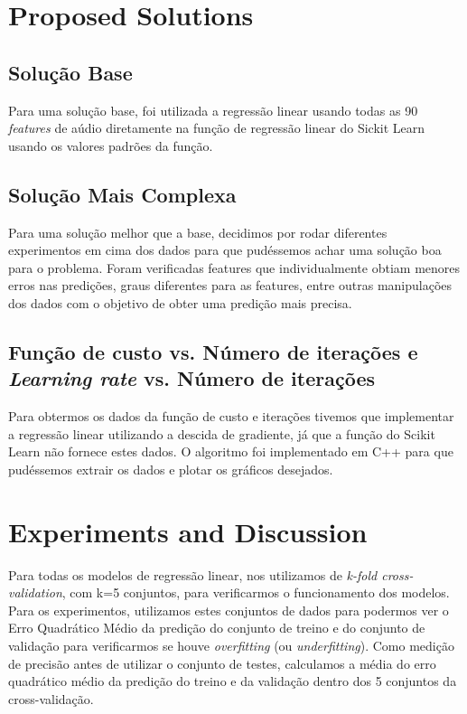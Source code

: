 \documentclass[conference]{IEEEtran}
\begin{document}
\section{Proposed Solutions}
\subsection{Solução Base}
Para uma solução base, foi utilizada a regressão linear usando todas as 90 \textit{features} de aúdio diretamente na função de regressão linear do Sickit Learn usando os valores padrões da função.

\subsection{Solução Mais Complexa}
Para uma solução melhor que a base, decidimos por rodar diferentes experimentos em cima dos dados para que pudéssemos achar uma solução boa para o problema. Foram verificadas features que individualmente obtiam menores erros nas predições, graus diferentes para as features, entre outras manipulações dos dados com o objetivo de obter uma predição mais precisa.

\subsection{Função de custo vs. Número de iterações e \textit{Learning rate} vs. Número de iterações}
Para obtermos os dados da função de custo e iterações tivemos que implementar a regressão linear utilizando a descida de gradiente, já que a função do Scikit Learn não fornece estes dados. O algoritmo foi implementado em C++ para que pudéssemos extrair os dados e plotar os gráficos desejados.

\section{Experiments and Discussion}
Para todas os modelos de regressão linear, nos utilizamos de \textit{k-fold cross-validation}, com k=5 conjuntos, para verificarmos o funcionamento dos modelos. Para os experimentos, utilizamos estes conjuntos de dados para podermos ver o Erro Quadrático Médio da predição do conjunto de treino e do conjunto de validação para verificarmos se houve \textit{overfitting} (ou \textit{underfitting}). Como medição de precisão antes de utilizar o conjunto de testes, calculamos a média do erro quadrático médio da predição do treino e da validação dentro dos 5 conjuntos da cross-validação.
\end{document}
